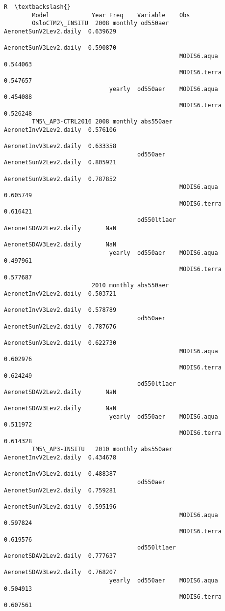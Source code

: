 \documentclass[11pt]{article}
\begin{document}
\begin{Verbatim}[commandchars=\\\{\}]
                                                                                 R  \textbackslash{}
        Model            Year Freq    Variable    Obs                                
        OsloCTM2\_INSITU  2008 monthly od550aer    AeronetSunV2Lev2.daily  0.639629   
                                                  AeronetSunV3Lev2.daily  0.590870   
                                                  MODIS6.aqua             0.544063   
                                                  MODIS6.terra            0.547657   
                              yearly  od550aer    MODIS6.aqua             0.454088   
                                                  MODIS6.terra            0.526248   
        TM5\_AP3-CTRL2016 2008 monthly abs550aer   AeronetInvV2Lev2.daily  0.576106   
                                                  AeronetInvV3Lev2.daily  0.633358   
                                      od550aer    AeronetSunV2Lev2.daily  0.805921   
                                                  AeronetSunV3Lev2.daily  0.787852   
                                                  MODIS6.aqua             0.605749   
                                                  MODIS6.terra            0.616421   
                                      od550lt1aer AeronetSDAV2Lev2.daily       NaN   
                                                  AeronetSDAV3Lev2.daily       NaN   
                              yearly  od550aer    MODIS6.aqua             0.497961   
                                                  MODIS6.terra            0.577687   
                         2010 monthly abs550aer   AeronetInvV2Lev2.daily  0.503721   
                                                  AeronetInvV3Lev2.daily  0.578789   
                                      od550aer    AeronetSunV2Lev2.daily  0.787676   
                                                  AeronetSunV3Lev2.daily  0.622730   
                                                  MODIS6.aqua             0.602976   
                                                  MODIS6.terra            0.624249   
                                      od550lt1aer AeronetSDAV2Lev2.daily       NaN   
                                                  AeronetSDAV3Lev2.daily       NaN   
                              yearly  od550aer    MODIS6.aqua             0.511972   
                                                  MODIS6.terra            0.614328   
        TM5\_AP3-INSITU   2010 monthly abs550aer   AeronetInvV2Lev2.daily  0.434678   
                                                  AeronetInvV3Lev2.daily  0.488387   
                                      od550aer    AeronetSunV2Lev2.daily  0.759281   
                                                  AeronetSunV3Lev2.daily  0.595196   
                                                  MODIS6.aqua             0.597824   
                                                  MODIS6.terra            0.619576   
                                      od550lt1aer AeronetSDAV2Lev2.daily  0.777637   
                                                  AeronetSDAV3Lev2.daily  0.768207   
                              yearly  od550aer    MODIS6.aqua             0.504913   
                                                  MODIS6.terra            0.607561   
        

\end{Verbatim}
\end{document}
